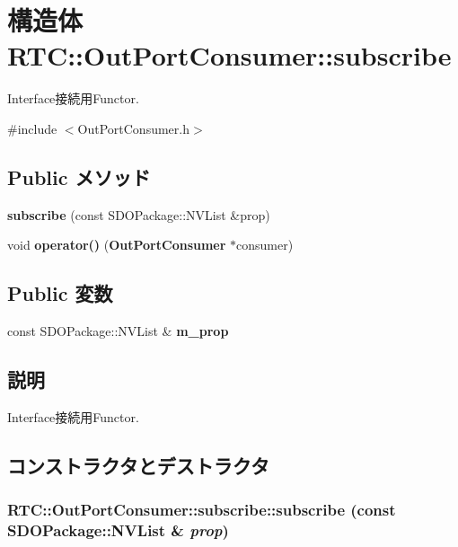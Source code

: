\section{構造体 RTC::OutPortConsumer::subscribe}
\label{structRTC_1_1OutPortConsumer_1_1subscribe}


Interface接続用Functor.  




{\ttfamily \#include $<$OutPortConsumer.h$>$}

\subsection*{Public メソッド}
\begin{DoxyCompactItemize}
\item 
{\bf subscribe} (const SDOPackage::NVList \&prop)
\item 
void {\bf operator()} ({\bf OutPortConsumer} $\ast$consumer)
\end{DoxyCompactItemize}
\subsection*{Public 変数}
\begin{DoxyCompactItemize}
\item 
const SDOPackage::NVList \& {\bf m\_\-prop}
\end{DoxyCompactItemize}


\subsection{説明}
Interface接続用Functor. 

\subsection{コンストラクタとデストラクタ}
\subsubsection[{subscribe}]{\setlength{\rightskip}{0pt plus 5cm}RTC::OutPortConsumer::subscribe::subscribe (const SDOPackage::NVList \& {\em prop})\hspace{0.3cm}{\ttfamily  [inline]}}\label{structRTC_1_1OutPortConsumer_1_1subscribe_a4bbbb148a1ac4e57872f0a26e983434f}


